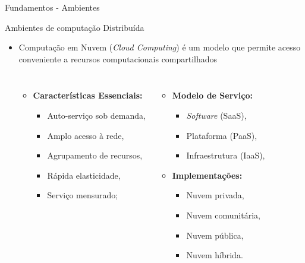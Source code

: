 \documentclass[aspectratio=1610,10pt]{beamer}
\begin{document}
\begin{frame}[fragile]{Fundamentos - Ambientes}
\begin{alertblock}{Ambientes de computação Distribuída}
\begin{itemize}
  \item Computação em Nuvem (\emph{Cloud Computing}) é um modelo que permite
  acesso conveniente a recursos computacionais compartilhados \cite{NIST2011}
  \begin{columns}[T,onlytextwidth]
    \begin{itemize}
      \item \textbf{Características Essenciais:}
      \begin{itemize}
        \item Auto-serviço sob demanda,
        \item Amplo acesso à rede,
        \item Agrupamento de recursos,
        \item Rápida elasticidade,
        \item Serviço mensurado;
      \end{itemize}
    \end{itemize}
    \begin{itemize}
      \item \textbf{Modelo de Serviço:}
      \begin{itemize}
        \item \emph{Software} (SaaS),
        \item Plataforma (PaaS),
        \item Infraestrutura (IaaS),
      \end{itemize}
      \item \textbf{Implementações:}
      \begin{itemize}
        \item Nuvem privada,
        \item Nuvem comunitária,
        \item Nuvem pública,
        \item Nuvem híbrida.
      \end{itemize}
    \end{itemize}
  \end{columns}
\end{itemize}
\end{alertblock}
\end{frame}
\end{document}

